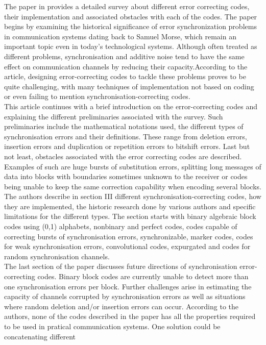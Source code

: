 \documentclass[12pt]%
{article}
\begin{document}
The paper in \cite{mercier2010survey} provides a detailed survey about different error correcting codes, their implementation
and associated obstacles with each of the codes. The paper begins by examining the historical significance of error synchronization problems in
communication systems dating back to Samuel Morse, which remain an important topic even in today's technological systems. Although often treated as
different problems, synchronisation and additive noise tend to have the same effect on communication channels by reducing their capacity.According to the 
article, designing error-correcting codes to tackle these problems proves to be quite challenging, with many techniques of implementation not based on coding or even 
failing to mention synchronisation-correcting codes. \\
This article continues with a brief introduction on the error-correcting codes and explaining the 
different preliminaries associated with the survey. Such preliminaries include the mathematical notations used, the different types of synchronisation errors and their definitions.
These range from deletion errors, insertion errors and duplication or repetition errors to bitshift errors. Last but not least, obstacles associated with the 
error correcting codes are described. Examples of such are huge bursts of substitution errors, splitting long messages of data into blocks with boundaries
sometimes unknown to the receiver or codes being unable to keep the same correction capability when encoding several blocks. The authors describe in section III different 
synchronisation-correcting codes, how they are implemented, the historic research done by various authors and specific limitations for the different types. The section starts
with binary algebraic block codes using (0,1) alphabets, nonbinary and perfect codes, codes capable of correcting bursts of synchronisation errors, synchronizable, marker codes, codes for weak
synchronisation errors, convolutional codes, expurgated and codes for random synchronisation channels. \\
The last section of the paper discusses future directions of synchronisation error-correcting codes. Binary block codes are currently unable to detect more than one synchronisation
errors per block. Further challenges arise in estimating the capacity of channels corrupted by synchronisation errors as well as situations where random deletion and/or insertion errors can occur.
According to the authors, none of the codes described in the paper has all the properties required to be used in pratical communication systems. One solution could be concatenating different
\end{document}
